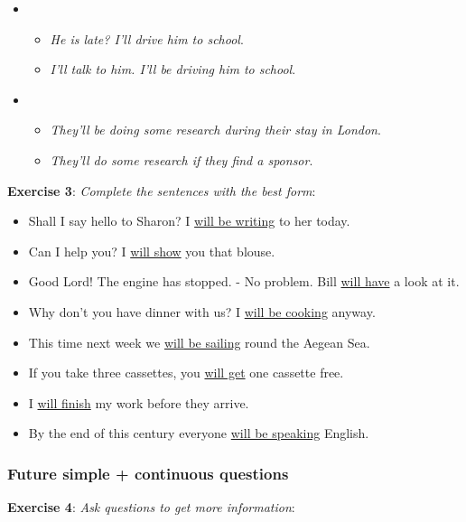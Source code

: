 \begin{itemize}
\item
\begin{itemize}
\item \textit{He is late? I'll drive him to school}.
\item \textit{I'll talk to him. I'll be driving him to school}.
\end{itemize}

\item
\begin{itemize}
\item \textit{They'll be doing some research during their stay in London}.
\item \textit{They'll do some research if they find a sponsor}.
\end{itemize}

\end{itemize}

\textbf{Exercise 3}: \textit{Complete the sentences with the best form}:

\begin{itemize}

\item Shall I say hello to Sharon? I \underline{will be writing} to her today.
\item Can I help you? I \underline{will show} you that blouse.
\item Good Lord! The engine has stopped. - No problem. Bill \underline{will have} a look at it.
\item Why don't you have dinner with us? I \underline{will be cooking} anyway.
\item This time next week we \underline{will be sailing} round the Aegean Sea.
\item If you take three cassettes, you \underline{will get} one cassette free.
\item I \underline{will finish} my work before they arrive.
\item By the end of this century everyone \underline{will be speaking} English.

\end{itemize}

\subsubsection{Future simple + continuous questions}

\textbf{Exercise 4}: \textit{Ask questions to get more information}:

